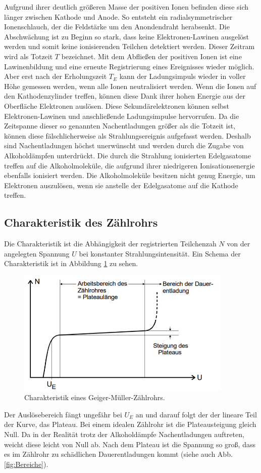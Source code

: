 Aufgrund ihrer deutlich größeren Masse der positiven Ionen befinden diese sich länger zwischen Kathode und Anode.
So entsteht ein radialsymmetrischer Ionenschlauch, der die Feldstärke um den Anondendraht herabsenkt.
Die Abschwächung ist zu Beginn so stark, dass keine Elektronen-Lawinen ausgelöst werden und somit keine ionisierenden Teilchen detektiert werden.
Dieser Zeitram wird als Totzeit $T$ bezeichnet.
Mit dem Abfließen der positiven Ionen ist eine Lawinenbildung und eine erneute Registrierung eines Ereignisses wieder möglich.
Aber erst nach der Erholungszeit $T_E$ kann der Ladungsimpuls wieder in voller Höhe gemessen werden, wenn alle Ionen neutralisiert werden.
Wenn die Ionen auf den Kathodenzylinder treffen, können diese Dank ihrer hohen Energie aus der Oberfläche Elektronen auslösen.
Diese Sekundärelektronen können selbst Elektronen-Lawinen und anschließende Ladungsimpulse hervorrufen.
Da die Zeitspanne dieser so genannten Nachentladungen größer als die Totzeit ist, können diese fälschlicherweise als Strahlungsereignis aufgefasst werden.
Deshalb sind Nachentladungen höchst unerwünscht und werden durch die Zugabe von Alkoholdämpfen unterdrückt.
Die durch die Strahlung ionisierten Edelgasatome treffen auf die Alkoholmoleküle, die aufgrund ihrer niedrigeren Ionisationsenergie ebenfalls ionisiert werden.
Die Alkoholmoleküle besitzen nicht genug Energie, um Elektronen auszulösen, wenn sie anstelle der Edelgasatome auf die Kathode treffen. \cite{V703}

\subsection{Charakteristik des Zählrohrs}

Die Charakteristik ist die Abhängigkeit der registrierten Teilchenzah $N$ von der angelegten Spannung $U$ bei konstanter Strahlungsintensität.
Ein Schema der Charakteristik ist in Abbildung \ref{fig:Charakteristik} zu sehen.
\begin{figure}
  \centering
  \includegraphics[height=6cm]{data/Charakteristik.png}
  \caption{Charakteristik eines Geiger-Müller-Zählrohrs. \cite{V703}}
  \label{fig:Charakteristik}
\end{figure}
Der Auslösebereich fängt ungefähr bei $U_E$ an und darauf folgt der der lineare Teil der Kurve, das Plateau.
Bei einem idealen Zählrohr ist die Plateausteigung gleich Null.
Da in der Realität trotz der Alkoholdämpfe Nachentladungen auftreten, weicht diese leicht von Null ab.
Nach dem Plateau ist die Spannung so groß, dass es im Zählrohr zu schädlichen Dauerentladungen kommt (siehe auch Abb. \ref{fig:Bereiche}). \cite{V703}
